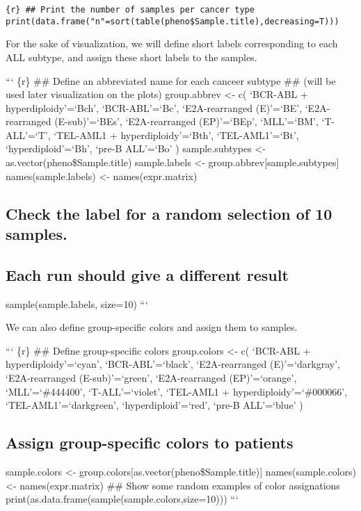 \texttt{\{r\} \#\# Print the number of samples per cancer type print(data.frame("n"=sort(table(pheno\$Sample.title),decreasing=T)))}

For the sake of visualization, we will define short labels corresponding
to each ALL subtype, and assign these short labels to the samples.

``` \{r\} \#\# Define an abbreviated name for each canceer subtype \#\#
(will be used later visualization on the plots) group.abbrev
\textless{}- c( `BCR-ABL + hyperdiploidy'=`Bch', `BCR-ABL'=`Bc',
`E2A-rearranged (E)'=`BE', `E2A-rearranged (E-sub)'=`BEs',
`E2A-rearranged (EP)'=`BEp', `MLL'=`BM', `T-ALL'=`T', `TEL-AML1 +
hyperdiploidy'=`Bth', `TEL-AML1'=`Bt', `hyperdiploid'=`Bh', `pre-B
ALL'=`Bo' ) sample.subtypes \textless{}- as.vector(pheno\$Sample.title)
sample.labels \textless{}- group.abbrev{[}sample.subtypes{]}
names(sample.labels) \textless{}- names(expr.matrix)

\subsection{Check the label for a random selection of 10
samples.}\label{check-the-label-for-a-random-selection-of-10-samples.}

\subsection{Each run should give a different
result}\label{each-run-should-give-a-different-result}

sample(sample.labels, size=10) ```

We can also define group-specific colors and assign them to samples.

``` \{r\} \#\# Define group-specific colors group.colors \textless{}- c(
`BCR-ABL + hyperdiploidy'=`cyan', `BCR-ABL'=`black', `E2A-rearranged
(E)'=`darkgray', `E2A-rearranged (E-sub)'=`green', `E2A-rearranged
(EP)'=`orange', `MLL'=`\#444400', `T-ALL'=`violet', `TEL-AML1 +
hyperdiploidy'=`\#000066', `TEL-AML1'=`darkgreen', `hyperdiploid'=`red',
`pre-B ALL'=`blue' )

\subsection{Assign group-specific colors to
patients}\label{assign-group-specific-colors-to-patients}

sample.colors \textless{}-
group.colors{[}as.vector(pheno\$Sample.title){]} names(sample.colors)
\textless{}- names(expr.matrix) \#\# Show some random examples of color
assignations print(as.data.frame(sample(sample.colors,size=10))) ```

